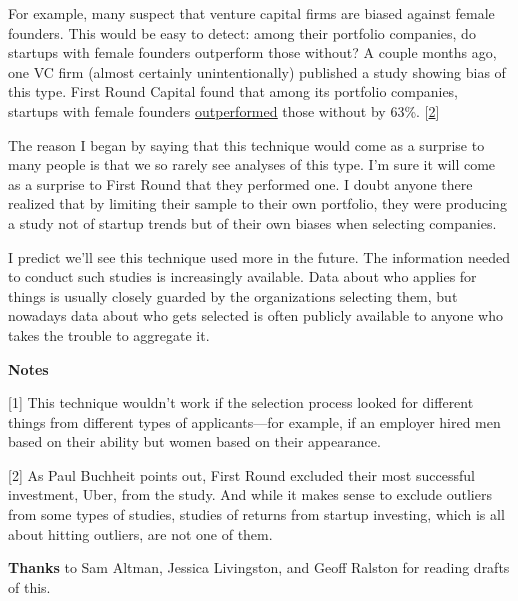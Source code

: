 For example,
                  many suspect that venture capital firms are biased against
                  female founders. This would be easy to detect: among their
                  portfolio companies, do startups with female founders
                  outperform those without? A couple months ago, one VC firm
                  (almost certainly unintentionally) published a study showing
                  bias of this type. First Round Capital found that among its
                  portfolio companies, startups with female founders
                  \href{http://10years.firstround.com/\#one}{\underline{outperformed}}
                  those without by 63\%.
                  [\href{\#f2n}{2}]

The reason I began by saying that this technique
                  would come as a surprise to many people is that we so rarely
                  see analyses of this type. I'm sure it will come as a surprise
                  to First Round that they performed one. I doubt anyone there
                  realized that by limiting their sample to their own portfolio,
                  they were producing a study not of startup trends but of their
                  own biases when selecting companies.

I predict
                  we'll see this technique used more in the future. The
                  information needed to conduct such studies is increasingly
                  available. Data about who applies for things is usually
                  closely guarded by the organizations selecting them, but
                  nowadays data about who gets selected is often publicly
                  available to anyone who takes the trouble to aggregate it.








                  \textbf{Notes}

[1] This technique wouldn't work if the selection process
                  looked for different things from different types of
                  applicants---for example, if an employer hired men based
                  on their ability but women based on their appearance.

[2] As Paul Buchheit points out, First Round excluded their
                  most successful investment, Uber, from the study. And while it
                  makes sense to exclude outliers from some types of studies,
                  studies of returns from startup investing, which is all about
                  hitting outliers, are not one of them.


                  \textbf{Thanks} to Sam Altman, Jessica Livingston, and Geoff
                  Ralston for reading drafts of this.


              
            
          
